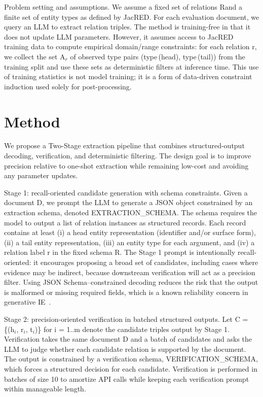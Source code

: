 \documentclass{article} %
\begin{document}
Problem setting and assumptions. We assume a fixed set of relations R\@ and a finite set of entity types as defined by JacRED\@. For each evaluation document, we query an LLM to extract relation triples. The method is training-free in that it does not update LLM parameters\@. However, it assumes access to JacRED training data to compute empirical domain/range constraints: for each relation r, we collect the set A$_r$ of observed type pairs (type\,(head), type\,(tail)) from the training split and use these sets as deterministic filters at inference time. This use of training statistics is not model training; it is a form of data-driven constraint induction used solely for post-processing.

\section{Method}\label{sec:method}
We propose a Two-Stage extraction pipeline that combines structured-output decoding, verification, and deterministic filtering. The design goal is to improve precision relative to one-shot extraction while remaining low-cost and avoiding any parameter updates.

Stage 1: recall-oriented candidate generation with schema constraints. Given a document D, we prompt the LLM to generate a JSON object constrained by an extraction schema, denoted EXTRACTION\_SCHEMA\@. The schema requires the model to output a list of relation instances as structured records. Each record contains at least (i) a head entity representation (identifier and/or surface form), (ii) a tail entity representation, (iii) an entity type for each argument, and (iv) a relation label r in the fixed schema R. The Stage 1 prompt is intentionally recall-oriented: it encourages proposing a broad set of candidates, including cases where evidence may be indirect, because downstream verification will act as a precision filter. Using JSON Schema–constrained decoding reduces the risk that the output is malformed or missing required fields, which is a known reliability concern in generative IE~\cite{geng-2025-generating}.

Stage 2: precision-oriented verification in batched structured outputs. Let C = \{(h$_i$, r$_i$, t$_i$)\} for i = 1..m denote the candidate triples output by Stage 1. Verification takes the same document D and a batch of candidates and asks the LLM to judge whether each candidate relation is supported by the document. The output is constrained by a verification schema, VERIFICATION\_SCHEMA, which forces a structured decision for each candidate. Verification is performed in batches of size 10 to amortize API calls while keeping each verification prompt within manageable length.
\end{document}
